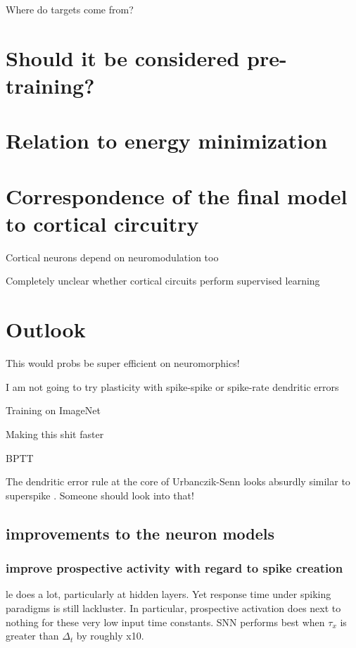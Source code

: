 Where do targets come from? \cite{Bengio2015}

\section{Should it be considered pre-training?}


\section{Relation to energy minimization}


\section{Correspondence of the final model to cortical circuitry}

Cortical neurons depend on neuromodulation too \cite{Roelfsema2018}

Completely unclear whether cortical circuits perform supervised learning \citep{magee2020synaptic}

\section{Outlook}

This would probs be super efficient on neuromorphics!

I am not going to try plasticity with spike-spike or spike-rate dendritic errors

Training on ImageNet

Making this shit faster

BPTT


The dendritic error rule at the core of Urbanczik-Senn looks absurdly similar to superspike \citep{Zenke2018}.
Someone should look into that!


\subsection{improvements to the neuron models}

\subsubsection{improve prospective activity with regard to spike creation}

le does a lot, particularly at hidden layers. Yet response time under spiking paradigms is still
lackluster. In particular, prospective activation does next to nothing for these very low input time
constants. SNN performs best when $\tau_x$ is greater than $\Delta_t$ by roughly x10.

